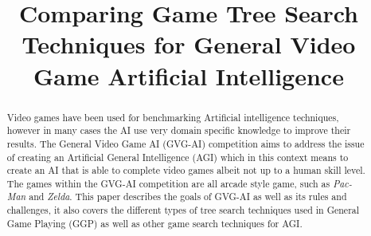 \documentclass[journal]{IEEEtran}
\begin{document}
%
\title{Comparing Game Tree Search Techniques for General Video Game Artificial Intelligence}
%
%
\author{
}


\maketitle

\begin{abstract}
	Video games have been used for benchmarking Artificial intelligence techniques, however in many cases the AI use very domain specific knowledge to improve their results. 
	The General Video Game AI (GVG-AI) competition aims to address the issue of creating an Artificial General Intelligence (AGI) which in this context means to create an AI that is able to complete video games albeit not up to a human skill level. The games within the GVG-AI competition are all arcade style game, such as \textit{Pac-Man} and \textit{Zelda}. 
	This paper describes the goals of GVG-AI as well as its rules and challenges, it also covers the different types of tree search techniques used in General Game Playing (GGP) as well as other game search techniques for AGI.
	
\end{abstract}
\end{document}
